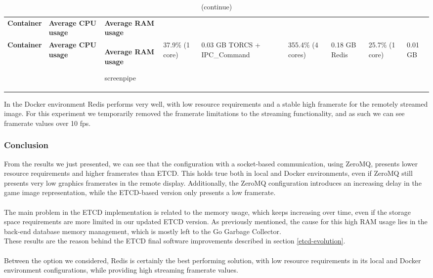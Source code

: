 \def\arraystretch{1.75}
\begin{longtable}{ 
		>{\centering}p{} 
		>{\centering}p{}
		>{\centering}p{}}
	
	
	\caption{Docker environment with Redis} \label{tab:resource-docker-env-redis} \\
	\coloredTableHead
	\textbf{\color{white}Container} & 
	\centering\textbf{\color{white}Average CPU usage} &
	\centering\textbf{\color{white}Average RAM usage}
	\endfirsthead
	
	\caption[]{(continue)}\\
	\textbf{\color{white}Container} & 
	\centering\textbf{\color{white}Average CPU usage} &
	\centering\textbf{\color{white}Average RAM usage}
	\endhead
	
	screenpipe & 37.9\% (1 core) & 0.03 GB \cr
	TORCS + IPC\_Command & 355.4\% (4 cores) & 0.18 GB \cr
	Redis & 25.7\% (1 core) & 0.01 GB \cr
\end{longtable}
\begin{center}
	\centering{\textbf{Average framerate = 45.4 fps}}
\end{center}
In the Docker environment Redis performs very well, with low resource requirements and a stable high framerate for the remotely streamed image. For this experiment we temporarily removed the framerate limitations to the streaming functionality, and as such we can see framerate values over 10 fps.

\subsubsection{Conclusion}
From the results we just presented, we can see that the configuration with a socket-based communication, using ZeroMQ, presents lower resource requirements and higher framerates than ETCD. This holds true both in local and Docker environments, even if ZeroMQ still presents very low graphics framerates in the remote display. Additionally, the ZeroMQ configuration introduces an increasing delay in the game image representation, while the ETCD-based version only presents a low framerate. \\ \\
The main problem in the ETCD implementation is related to the memory usage, which keeps increasing over time, even if the storage space requirements are more limited in our updated ETCD version. As previously mentioned, the cause for this high RAM usage lies in the back-end database memory management, which is mostly left to the Go Garbage Collector. \\
These results are the reason behind the ETCD final software improvements described in section \ref{etcd-evolution}. \\ \\
Between the option we considered, Redis is certainly the best performing solution, with low resource requirements in its local and Docker environment configurations, while providing high streaming framerate values.

